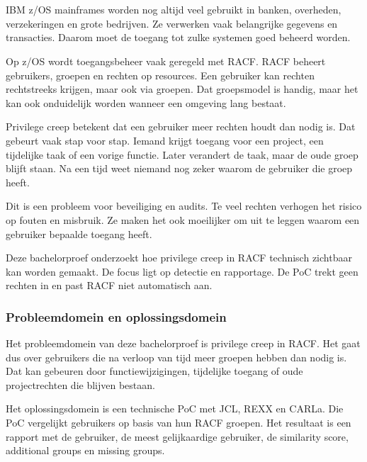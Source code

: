 
\chapter[Inleiding]{}%
\label{ch:inleiding}

IBM z/OS mainframes worden nog altijd veel gebruikt in banken, overheden, verzekeringen en grote bedrijven. Ze verwerken vaak belangrijke gegevens en transacties. Daarom moet de toegang tot zulke systemen goed beheerd worden.

Op z/OS wordt toegangsbeheer vaak geregeld met RACF. RACF beheert gebruikers, groepen en rechten op resources. Een gebruiker kan rechten rechtstreeks krijgen, maar ook via groepen. Dat groepsmodel is handig, maar het kan ook onduidelijk worden wanneer een omgeving lang bestaat.

Privilege creep betekent dat een gebruiker meer rechten houdt dan nodig is. Dat gebeurt vaak stap voor stap. Iemand krijgt toegang voor een project, een tijdelijke taak of een vorige functie. Later verandert de taak, maar de oude groep blijft staan. Na een tijd weet niemand nog zeker waarom de gebruiker die groep heeft.

Dit is een probleem voor beveiliging en audits. Te veel rechten verhogen het risico op fouten en misbruik. Ze maken het ook moeilijker om uit te leggen waarom een gebruiker bepaalde toegang heeft.

Deze bachelorproef onderzoekt hoe privilege creep in RACF technisch zichtbaar kan worden gemaakt. De focus ligt op detectie en rapportage. De PoC trekt geen rechten in en past RACF niet automatisch aan.

\subsection*{Probleemdomein en oplossingsdomein}

Het probleemdomein van deze bachelorproef is privilege creep in RACF. Het gaat dus over gebruikers die na verloop van tijd meer groepen hebben dan nodig is. Dat kan gebeuren door functiewijzigingen, tijdelijke toegang of oude projectrechten die blijven bestaan.

Het oplossingsdomein is een technische PoC met JCL, REXX en CARLa. Die PoC vergelijkt gebruikers op basis van hun RACF groepen. Het resultaat is een rapport met de gebruiker, de meest gelijkaardige gebruiker, de similarity score, additional groups en missing groups.

